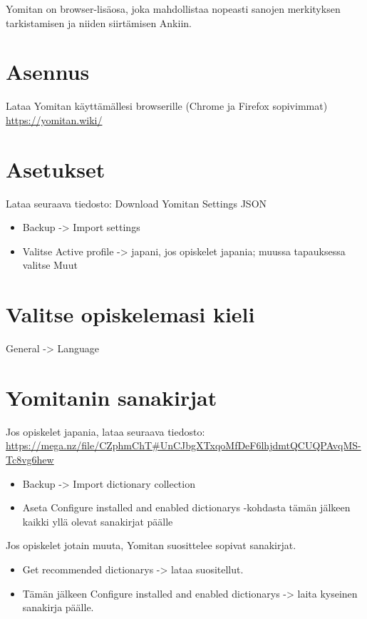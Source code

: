 \documentclass[
]{book}
\providecommand{\tightlist}{%
  \setlength{\itemsep}{0pt}\setlength{\parskip}{0pt}}
\begin{document}
Yomitan on browser-lisäosa, joka mahdollistaa nopeasti sanojen merkityksen tarkistamisen ja niiden siirtämisen Ankiin.

\section{Asennus}\label{asennus}

Lataa Yomitan käyttämällesi browserille (Chrome ja Firefox sopivimmat)
\url{https://yomitan.wiki/}

\section{Asetukset}\label{asetukset}

Lataa seuraava tiedosto: Download Yomitan Settings JSON

\begin{itemize}
\tightlist
\item
  Backup -\textgreater{} Import settings
\item
  Valitse Active profile -\textgreater{} japani, jos opiskelet japania; muussa tapauksessa valitse Muut
\end{itemize}

\section{Valitse opiskelemasi kieli}\label{valitse-opiskelemasi-kieli}

General -\textgreater{} Language

\section{Yomitanin sanakirjat}\label{yomitanin-sanakirjat}

Jos opiskelet japania, lataa seuraava tiedosto: \url{https://mega.nz/file/CZphmChT\#UnCJbgXTxqoMfDeF6lhjdmtQCUQPAvqMS-Tc8vg6hew}

\begin{itemize}
\item
  Backup -\textgreater{} Import dictionary collection
\item
  Aseta Configure installed and enabled dictionarys -kohdasta tämän jälkeen kaikki yllä olevat sanakirjat päälle
\end{itemize}

Jos opiskelet jotain muuta, Yomitan suosittelee sopivat sanakirjat.

\begin{itemize}
\item
  Get recommended dictionarys -\textgreater{} lataa suositellut.
\item
  Tämän jälkeen Configure installed and enabled dictionarys -\textgreater{} laita kyseinen sanakirja päälle.
\end{itemize}
\end{document}
